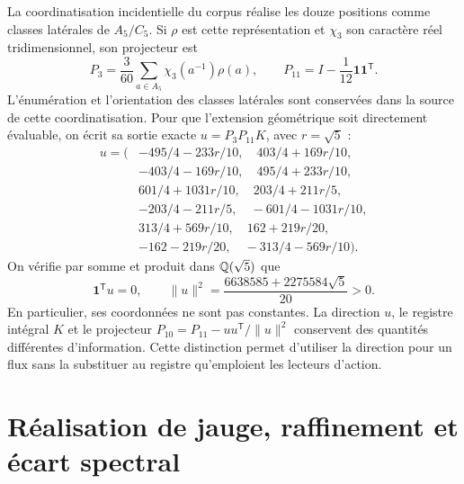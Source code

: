 \documentclass[a4paper,10pt]{article}
\theoremstyle{definition}\newtheorem{definition}[theorem]{Définition}
\theoremstyle{remark}\newtheorem{remark}[theorem]{Remarque}
\numberwithin{equation}{section}
\begin{document}
La coordinatisation incidentielle du corpus réalise les douze positions comme classes latérales de \(A_5/C_5\). Si \(\rho\) est cette représentation et \(\chi_3\) son caractère réel tridimensionnel, son projecteur est
\[
 P_3=\frac3{60}\sum_{a\in A_5}\chi_3(a^{-1})\rho(a),\qquad
 P_{11}=I-\frac1{12}\mathbf1\mathbf1^{\mathsf T}.
\]
L'énumération et l'orientation des classes latérales sont conservées dans la source de cette coordinatisation. Pour que l'extension géométrique soit directement évaluable, on écrit sa sortie exacte \(u=P_3P_{11}K\), avec \(r=\sqrt5\) :
\begin{equation}
\begin{split}
u=\bigl(&-495/4-233r/10,\quad403/4+169r/10,\\
&-403/4-169r/10,\quad495/4+233r/10,\\
&601/4+1031r/10,\quad203/4+211r/5,\\
&-203/4-211r/5,\quad-601/4-1031r/10,\\
&313/4+569r/10,\quad162+219r/20,\\
&-162-219r/20,\quad-313/4-569r/10\bigr).
\end{split}
\label{eq:u-main}
\end{equation}
On vérifie par somme et produit dans \(\mathbb Q(\sqrt5)\) que
\[
 \mathbf1^{\mathsf T}u=0,\qquad
 \|u\|^2=\frac{6638585+2275584\sqrt5}{20}>0.
\]
En particulier, ses coordonnées ne sont pas constantes. La direction \(u\), le registre intégral \(K\) et le projecteur \(P_{10}=P_{11}-uu^{\mathsf T}/\|u\|^2\) conservent des quantités différentes d'information. Cette distinction permet d'utiliser la direction pour un flux sans la substituer au registre qu'emploient les lecteurs d'action.




















\clearpage
\part{Réalisation de jauge, raffinement et écart spectral}






\end{document}
